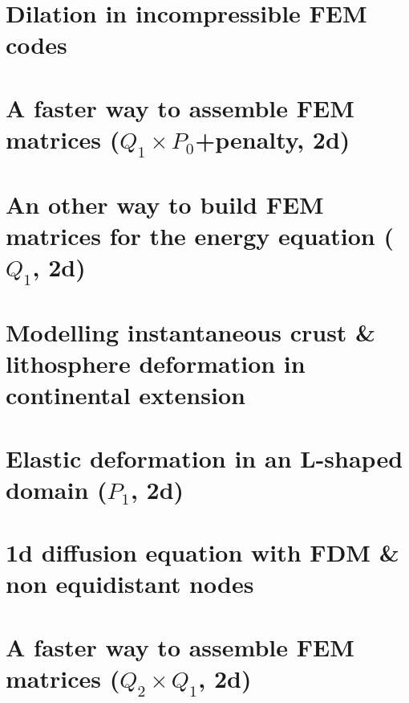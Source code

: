 \documentclass[a4paper,11pt]{report}
\begin{document}
\chapter{Dilation in incompressible FEM codes \label{f175}} %

\chapter{A faster way to assemble FEM matrices ($Q_1\times P_0$+penalty, 2d) \label{f176}} %

\chapter{An other way to build FEM matrices for the energy equation ($Q_1$, 2d) \label{f177}} %

\chapter{Modelling instantaneous crust \& lithosphere deformation in continental extension \label{f178}} %

\chapter{Elastic deformation in an L-shaped domain ($P_1$, 2d) \label{f179}} %

\chapter{1d diffusion equation with FDM \& non equidistant nodes\label{f180}} %

\chapter{A faster way to assemble FEM matrices ($Q_2\times Q_1$, 2d) \label{f181}} %
\end{document}
